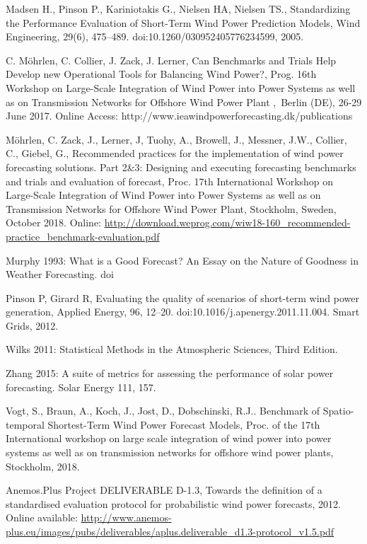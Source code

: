\begin{thebibliography}{27}
Madsen H., Pinson P., Kariniotakis G., Nielsen HA, Nielsen TS., Standardizing the Performance Evaluation of Short-Term Wind Power Prediction Models, Wind Engineering, 29(6), 475–489. doi:10.1260/030952405776234599, 2005.

C. M\"ohrlen, C. Collier, J. Zack, J. Lerner, Can Benchmarks and Trials Help Develop new Operational Tools for Balancing Wind Power?, Prog. 16th Workshop on Large-Scale Integration of Wind Power into Power Systems as well as on Transmission Networks for Offshore Wind Power Plant , Berlin (DE), 26-29 June 2017.
Online Access: http://www.ieawindpowerforecasting.dk/publications

M\"ohrlen, C. Zack, J., Lerner, J, Tuohy, A., Browell, J., Messner, J.W., Collier, C.,  Giebel, G., Recommended practices for the implementation of wind power forecasting solutions. Part 2\&3: Designing and executing forecasting benchmarks and trials and evaluation of forecast, Proc. 17th International Workshop on Large-Scale Integration of Wind Power into Power Systems as well as on Transmission Networks for Offshore Wind Power Plant, Stockholm, Sweden, October 2018. Online: \url{http://download.weprog.com/wiw18-160_recommended-practice_benchmark-evaluation.pdf}

Murphy 1993: What is a Good Forecast? An Essay on the Nature of Goodness in Weather Forecasting. doi

Pinson P, Girard R, Evaluating the quality of scenarios of short-term wind power generation, Applied Energy, 96, 12–20. doi:10.1016/j.apenergy.2011.11.004. Smart Grids, 2012.

Wilks 2011: Statistical Methods in the Atmospheric Sciences, Third Edition.

Zhang 2015: A suite of metrics for assessing the performance of solar power forecasting. Solar Energy 111, 157.

Vogt, S., Braun, A., Koch, J., Jost, D., Dobschinski, R.J.. Benchmark of Spatio-temporal Shortest-Term Wind Power Forecast Models, Proc. of the 17th International workshop on large scale integration of wind power into power systems as well as on transmission networks for offshore wind power plants, Stockholm, 2018.

Anemos.Plus Project DELIVERABLE D-1.3, Towards the definition of a standardised evaluation protocol for probabilistic wind power forecasts, 2012. \\
Online available: \url{http://www.anemos-plus.eu/images/pubs/deliverables/aplus.deliverable_d1.3-protocol_v1.5.pdf}


\end{thebibliography}
